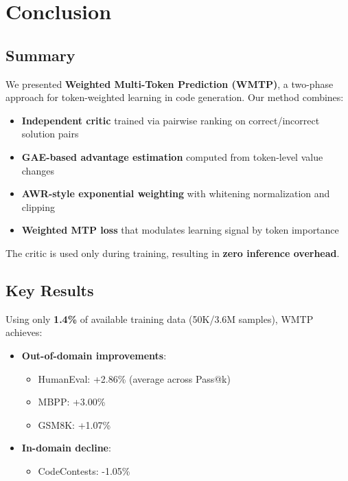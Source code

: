 \section{Conclusion}

\subsection{Summary}

We presented \textbf{Weighted Multi-Token Prediction (WMTP)}, a two-phase approach for token-weighted learning in code generation. Our method combines:

\begin{itemize}[nosep]
    \item \textbf{Independent critic} trained via pairwise ranking on correct/incorrect solution pairs
    \item \textbf{GAE-based advantage estimation} computed from token-level value changes
    \item \textbf{AWR-style exponential weighting} with whitening normalization and clipping
    \item \textbf{Weighted MTP loss} that modulates learning signal by token importance
\end{itemize}

The critic is used only during training, resulting in \textbf{zero inference overhead}.

\subsection{Key Results}

Using only \textbf{1.4\%} of available training data (50K/3.6M samples), WMTP achieves:

\begin{itemize}[nosep]
    \item \textbf{Out-of-domain improvements}:
    \begin{itemize}[nosep]
        \item HumanEval: +2.86\% (average across Pass@k)
        \item MBPP: +3.00\%
        \item GSM8K: +1.07\%
    \end{itemize}
    \item \textbf{In-domain decline}:
    \begin{itemize}[nosep]
        \item CodeContests: -1.05\%
    \end{itemize}
\end{itemize}

